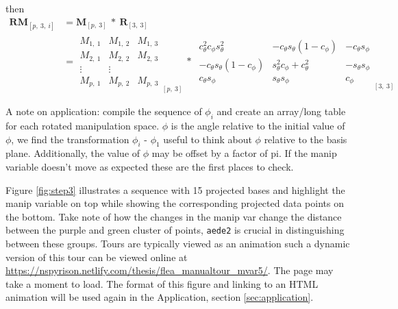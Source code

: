 \documentclass{monashthesis}
\begin{document}
then
\begin{align*}
  \textbf{RM}_{[p,~3,~i]}
  &= \textbf{M}_{[p,~3]} ~*~ \textbf{R}_{[3,~3]} \\
  &= \begin{array}{cc}
    M_{1,~1} & M_{1,~2} & M_{1,~3} \\
    M_{2,~1} & M_{2,~2} & M_{2,~3} \\
    \vdots   & \vdots   \\
    M_{p,~1} & M_{p,~2} & M_{p,~3}
  \end{array}_{[p,~3]}
    ~*~
  \begin{array}{ccc}
    c_\theta^2 c_\phi s_\theta^2 &
    -c_\theta s_\theta (1 - c_\phi) &
    -c_\theta s_\phi \\
    -c_\theta s_\theta (1 - c_\phi) &
    s_\theta^2 c_\phi + c_\theta^2 &
    -s_\theta s_\phi \\
    c_\theta s_\phi &
    s_\theta s_\phi &
    c_\phi
  \end{array}_{[3,~3]}
\end{align*}

A note on application: compile the sequence of \(\phi_i\) and create an array/long table for each rotated manipulation space. \(\phi\) is the angle relative to the initial value of \(\phi\), we find the transformation \(\phi_i\) - \(\phi_1\) useful to think about \(\phi\) relative to the basis plane. Additionally, the value of \(\phi\) may be offset by a factor of pi. If the manip variable doesn't move as expected these are the first places to check.

\begin{Shaded}
\begin{Highlighting}[]
 
\StringTok{ }\OperatorTok{+}\StringTok{ }
\StringTok{ }\NormalTok{(manip_space, theta, phi)[, }\OperatorTok{:}\NormalTok{]}
\NormalTok{\}}
\end{Highlighting}
\end{Shaded}

Figure \ref{fig:step3} illustrates a sequence with 15 projected bases and highlight the manip variable on top while showing the corresponding projected data points on the bottom. Take note of how the changes in the manip var change the distance between the purple and green cluster of points, \texttt{aede2} is crucial in distinguishing between these groups. Tours are typically viewed as an animation such a dynamic version of this tour can be viewed online at \url{https://nspyrison.netlify.com/thesis/flea_manualtour_mvar5/}. The page may take a moment to load. The format of this figure and linking to an HTML animation will be used again in the Application, section \ref{sec:application}.
\end{document}

